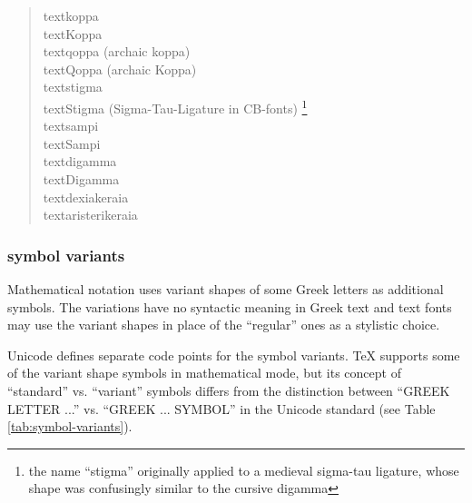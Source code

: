 \documentclass[a4paper]{scrartcl}
\begin{document}
\begin{quote}
\raggedright
\textkoppa{}      textkoppa                 \\ %
\textKoppa{}      textKoppa                 \\ %
\textqoppa{}      textqoppa (archaic koppa) \\ %
\textQoppa{}      textQoppa (archaic Koppa) \\ %
\textstigma{}     textstigma                \\ %
\textStigma{}     textStigma (Sigma-Tau-Ligature in CB-fonts)%
\footnote{the name “stigma” originally applied to a medieval sigma-tau
         ligature, whose shape was confusingly similar to the cursive
         digamma}                           \\ %
\textsampi{}      textsampi                 \\ %
\textSampi{}      textSampi                 \\ %
\textdigamma{}    textdigamma               \\ %
\textDigamma{}    textDigamma               \\ %
\textdexiakeraia{}    textdexiakeraia       \\ %
\textaristerikeraia{} textaristerikeraia    \\ %
\end{quote}

\subsubsection{symbol variants}

Mathematical notation uses variant shapes of some Greek letters as
additional symbols. The variations have no syntactic meaning in Greek text
and text fonts may use the variant shapes in place of the “regular” ones as
a stylistic choice.

Unicode defines separate code points for the symbol variants. TeX supports
some of the variant shape symbols in mathematical mode, but its concept of
“standard” vs. “variant” symbols differs from the distinction between
“GREEK LETTER ...” vs. “GREEK ... SYMBOL” in the Unicode standard (see
Table \ref{tab:symbol-variants}).
\end{document}
